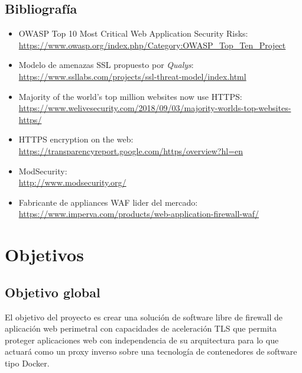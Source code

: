 \subsection{Bibliografía}
\begin{itemize}
  \item OWASP Top 10 Most Critical Web Application Security Risks:\\
    \href{https://www.owasp.org/index.php/Category:OWASP\_Top\_Ten\_Project}
    {https://www.owasp.org/index.php/Category:OWASP\_Top\_Ten\_Project}
  \item Modelo de amenazas SSL propuesto por {\em Qualys}:\\
    \href{https://www.ssllabs.com/projects/ssl-threat-model/index.html}
    {https://www.ssllabs.com/projects/ssl-threat-model/index.html}
  \item Majority of the world’s top million websites now use HTTPS:\\
    \href{https://www.welivesecurity.com/2018/09/03/majority-worlds-top-websites-https/}
    {https://www.welivesecurity.com/2018/09/03/majority-worlds-top-websites-https/}
  \item HTTPS encryption on the web:\\
    \href{https://transparencyreport.google.com/https/overview?hl=en}
    {https://transparencyreport.google.com/https/overview?hl=en}
  \item ModSecurity:\\
    \href{http://www.modsecurity.org/}
    {http://www.modsecurity.org/}
  \item Fabricante de appliances WAF lider del mercado:\\
    \href{https://www.imperva.com/products/web-application-firewall-waf/}
    {https://www.imperva.com/products/web-application-firewall-waf/}
\end{itemize}


\section{Objetivos}
\subsection{Objetivo global}
\par El objetivo del proyecto es crear una solución de software libre de firewall de aplicación web perimetral con
capacidades de aceleración TLS que permita proteger aplicaciones web con in\-de\-pen\-den\-cia de su arquitectura
para lo que actuará como un proxy inverso sobre una tecnología de contenedores de software tipo Docker.

